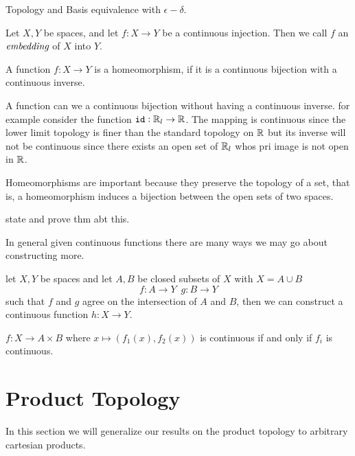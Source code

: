 \begin{chapter}{Topology and Basis}
   equivalence with $\epsilon-\delta$. 

   
   \begin{defn}
    Let $X, Y$ be spaces, and let $f:X \to Y$ be a continuous injection. Then we call $f$ an $\emph{embedding}$ 
    of $X$ into $Y$. 
   \end{defn}

   \begin{defn}
    A function $f:X \to Y$ is a homeomorphism, if it is a continuous bijection with a continuous inverse. 
   \end{defn}

   
   \begin{ex}
    A function can we a continuous bijection without having a continuous inverse. for example 
    consider the function ${\tt id}:\mathbb{R}_l \to \mathbb{R}$. The mapping is continuous since the lower limit topology 
    is finer than the standard topology on $\mathbb{R}$ but its inverse will not be continuous since there exists 
    an open set of $\mathbb{R}_l$ whos pri image is not open in $\mathbb{R}$. 
   \end{ex}


    Homeomorphisms are important because they preserve the topology of a set, that is, a homeomorphism induces a bijection 
    between the open sets of two spaces. 

   state and prove thm abt this. 

   In general given continuous functions there are many  ways we may go about constructing more. 




   
   \begin{thm}
    let $X, Y$ be spaces and let $A,B$ be closed subsets of $X$ with $X = A \cup B$
    \[f:A \to Y \, \, \, g:B \to Y\]
    such that $f$ and $g$ agree on the intersection of $A$ and $B$, 
    then we can construct a continuous function $h:X \to Y$. 
   \end{thm}


   \begin{thm}
    $f:X \to A \times B$ where $x \mapsto (f_1(x), f_2(x))$ 
    is continuous if and only if $f_i$ is continuous. 
   \end{thm}

   \section{Product Topology}
   In this section we will generalize our results on the product topology to arbitrary cartesian products. 


\end{chapter}

